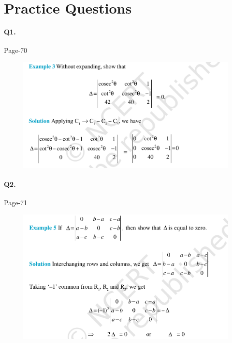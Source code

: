 \documentclass{article}
\begin{document}
\section*{Practice Questions}
\paragraph{Q1.}
\begin{flushright}
Page-70
\end{flushright}

\begin{figure}[H]
    \includegraphics[scale=0.5]{determinants_l2_ps_1.png}
\end{figure}

\paragraph{Q2.}
\begin{flushright}
Page-71
\end{flushright}

\begin{figure}[H]
    \includegraphics[scale=0.5]{determinants_l2_ps_2.png}
\end{figure}
\end{document}
